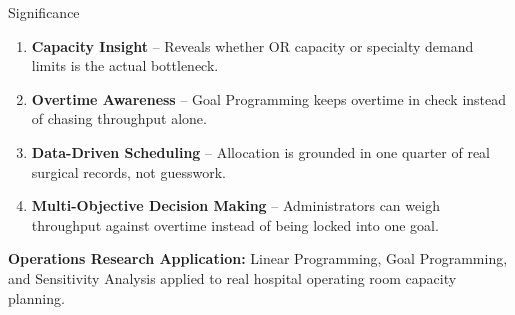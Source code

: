 \documentclass[aspectratio=169]{beamer}
\begin{document}
\begin{frame}{Significance}
    \begin{enumerate}
        \item \textbf{Capacity Insight} -- Reveals whether OR capacity or
        specialty demand limits is the actual bottleneck.
        \item \textbf{Overtime Awareness} -- Goal Programming keeps overtime
        in check instead of chasing throughput alone.
        \item \textbf{Data-Driven Scheduling} -- Allocation is grounded in
        one quarter of real surgical records, not guesswork.
        \item \textbf{Multi-Objective Decision Making} -- Administrators can
        weigh throughput against overtime instead of being locked into one goal.
    \end{enumerate}
    \vspace{10pt}
    \textbf{Operations Research Application:} Linear Programming, Goal
    Programming, and Sensitivity Analysis applied to real hospital operating
    room capacity planning.
\end{frame}
\end{document}
